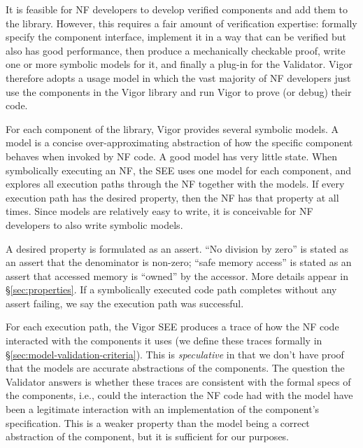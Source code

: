 \documentclass[letterpaper,twocolumn,10pt]{article}
\begin{document}
It is feasible for NF developers to develop verified components and add them to
the library. However, this requires a fair amount of verification expertise:
formally specify the component interface, implement it in a way that can be
verified but also has good performance, then produce a mechanically checkable
proof, write one or more symbolic models for it, and finally a plug-in for the
Validator. Vigor therefore adopts a usage model in which the vast majority of NF
developers just use the components in the Vigor library and run Vigor to prove
(or debug) their code.



For each component of the library, Vigor provides several symbolic models. A
model is a concise over-approximating abstraction of how the specific component
behaves when invoked by NF code. A good model has very little state. When
symbolically executing an NF, the SEE uses one model for each component, and
explores all execution paths through the NF together with the models. If every
execution path has the desired property, then the NF has that property at all
times. Since models are relatively easy to write, it is conceivable for NF
developers to also write symbolic models.

A desired property is formulated as an assert. ``No division by zero'' is stated
as an assert that the denominator is non-zero; ``safe memory access'' is stated
as an assert that accessed memory is ``owned'' by the accessor. More details
appear in \S\ref{sec:properties}. If a symbolically executed code path completes
without any assert failing, we say the execution path was successful.

For each execution path, the Vigor SEE produces a trace of how the NF code
interacted with the components it uses (we define these traces formally in
\S\ref{sec:model-validation-criteria}). This is {\em speculative} in that we
don't have proof that the models are accurate abstractions of the components.
The question the Validator answers is whether these traces are consistent with
the formal specs of the components, i.e., could the interaction the NF code had
with the model have been a legitimate interaction with an implementation of the
component's specification. This is a weaker property than the model being a
correct abstraction of the component, but it is sufficient for our purposes.
\end{document}
